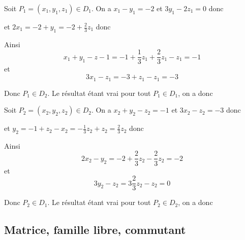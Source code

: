 \begin{correction}
Soit $P_1 =(x_1,y_1,z_1)\in D_1$. On a 
$x_1-y_1 =-2$ et $3y_1-2z_1= 0$ donc 
\begin{center}
\end{center}
et  $2x_1 =-2 +y_1 = -2 + \frac{2}{3}z_1$
donc 
\begin{center}
\end{center}
Ainsi 
$$x_1+y_1-z-1= -1 + \frac{1}{3}z_1 + \frac{2}{3}z_1 -z_1=-1$$
et 
$$3x_1-z_1 = -3 +z_1-z_1=-3$$

Donc $P_1 \in D_2$. Le résultat étant vrai pour tout $P_1 \in D_1$, on a donc 

\begin{center}

\end{center}


Soit $P_2 =(x_2,y_2,z_2)\in D_2$. On a 
$x_2+y_2 -z_2=-1$ et $3x_2-z_2= -3$ donc 
\begin{center}

\end{center}

et  $y_2 =-1+z_2-x_2 = -\frac{1}{3}z_2+z_2=\frac{2}{3}z_2$
donc 
\begin{center}

\end{center}


Ainsi 
$$2x_2-y_2 = -2 +\frac{2}{3}z_2-\frac{2}{3}z_2 =-2$$
et 
$$3y_2-z_2 = 3 \frac{2}{3}z_2 -z_2=0$$

Donc $P_2 \in D_1$. Le résultat étant vrai pour tout $P_2 \in D_2$, on a donc 

\begin{center}

\end{center}
\end{correction}



\subsection{Matrice, famille libre, commutant}

